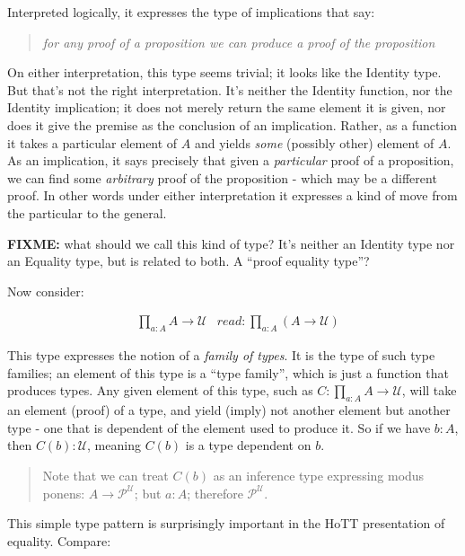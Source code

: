 \documentclass{article}
\begin{document}
Interpreted logically, it expresses the type of implications that say:

\begin{quote}
\textit{for any proof of a proposition we can produce a proof of the proposition}
\end{quote}

On either interpretation, this type seems trivial; it looks like the
Identity type.  But that's not the right interpretation.  It's neither
the Identity function, nor the Identity implication; it does not
merely return the same element it is given, nor does it give the
premise as the conclusion of an implication.  Rather, as a function it
takes a particular element of \(A\) and yields \emph{some} (possibly
other) element of \(A\).  As an implication, it says precisely that
given a \emph{particular} proof of a proposition, we can find some
\emph{arbitrary} proof of the proposition - which may be a different
proof.  In other words under either interpretation it expresses a kind
of move from the particular to the general.

\textbf{FIXME:} what should we call this kind of type?  It's neither
an Identity type nor an Equality type, but is related to both.  A
``proof equality type''?

Now consider:

\begin{align}
  &\prod\limits_{a{:}A}A\to\mathcal{U} & \textit{read:}\ \prod\limits_{a{:}A}(A\to\mathcal{U})
\end{align}

This type expresses the notion of a \emph{family of types}.  It is the
type of such type families; an element of this type is a ``type
family'', which is just a function that produces types.  Any given
element of this type, such as
\(C\colon\prod\limits_{a{:}A}A\to\mathcal{U}\), will take an element
(proof) of a type, and yield (imply) not another element but another
type - one that is dependent of the element used to produce it.  So if we
have \(b\colon A\), then \(C(b)\colon\mathcal{U}\), meaning \(C(b)\)
is a type dependent on \(b\).

\begin{quote}
Note that we can treat \(C(b)\) as an inference type expressing modus
ponens: \(A\to\mathcal{P}^{\mathcal{U}}\); but \(a{:}A\); therefore \(\mathcal{P}^{\mathcal{U}}\).
\end{quote}

This simple type pattern is surprisingly important in the HoTT
presentation of equality.  Compare:
\end{document}
